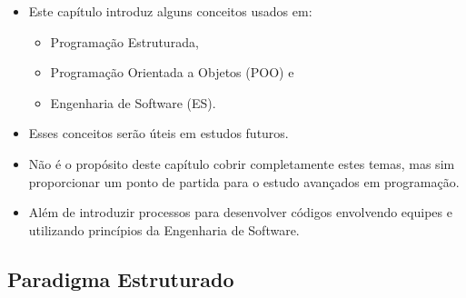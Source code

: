 \documentclass[12pt,a4paper]{article}
\providecommand{\tightlist}{%
      \setlength{\itemsep}{0pt}\setlength{\parskip}{0pt}}
\begin{document}
    \begin{itemize}
\tightlist
\item
  Este capítulo introduz alguns conceitos usados em:

  \begin{itemize}
  \tightlist
  \item
    Programação Estruturada,
  \item
    Programação Orientada a Objetos (POO) e
  \item
    Engenharia de Software (ES).
  \end{itemize}
\item
  Esses conceitos serão úteis em estudos futuros.
\item
  Não é o propósito deste capítulo cobrir completamente estes temas, mas
  sim proporcionar um ponto de partida para o estudo avançados em
  programação.
\item
  Além de introduzir processos para desenvolver códigos envolvendo
  equipes e utilizando princípios da Engenharia de Software.
\end{itemize}

    \hypertarget{paradigma-estruturado}{%
\subsection{Paradigma Estruturado}\label{paradigma-estruturado}}
\end{document}
